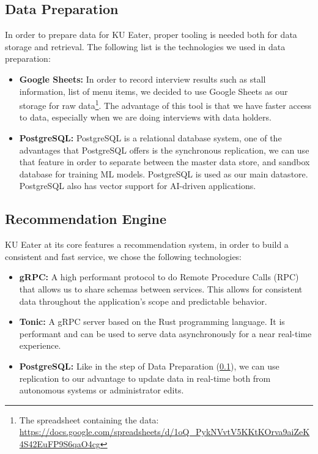 \subsection{Data Preparation}
\label{subsection:data-preparation-system}
In order to prepare data for KU Eater, proper tooling is needed both for data storage and retrieval. The following list is the technologies we used in data preparation:

\begin{itemize}[leftmargin=80pt]
    \item \textbf{Google Sheets:} In order to record interview results such as stall information, list of menu items, we decided to use Google Sheets as our storage for raw data\footnote{The spreadsheet containing the data: \url{https://docs.google.com/spreadsheets/d/1oQ_PykNVvtV5KKtKOrva9aiZeK4S42EuFP9S6qaO4cg}}.
    The advantage of this tool is that we have faster access to data, especially when we are doing interviews with data holders.
    \item \textbf{PostgreSQL:} PostgreSQL is a relational database system, one of the advantages that PostgreSQL offers is the synchronous replication, we can use that feature in order to separate between the master data store, and sandbox database for training ML models.
    PostgreSQL is used as our main datastore. PostgreSQL also has vector support for AI-driven applications.
\end{itemize}

\subsection{Recommendation Engine}
\label{subsection:recommendation-engine}
KU Eater at its core features a recommendation system, in order to build a consistent and fast service, we chose the following technologies:

\begin{itemize}[leftmargin=80pt]
    \item \textbf{gRPC:} A high performant protocol to do Remote Procedure Calls (RPC) that allows us to share schemas between
    services. This allows for consistent data throughout the application's scope and predictable behavior.
    \item \textbf{Tonic:} A gRPC server based on the Rust programming language. It is performant and can be
    used to serve data asynchronously for a near real-time experience.
    \item \textbf{PostgreSQL:} Like in the step of Data Preparation (\ref{subsection:data-preparation-system}), we can use replication to our advantage to update data in real-time
    both from autonomous systems or administrator edits.
\end{itemize}


